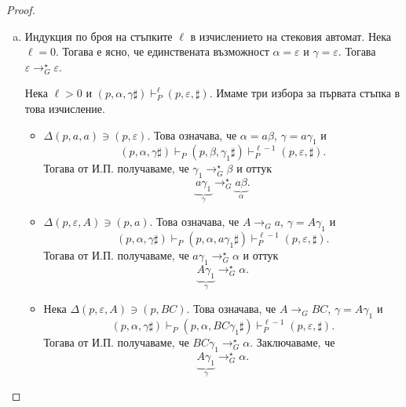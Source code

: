 \begin{proof}
\begin{enumerate}[(a)]
    Нека $\ell > 0$ и $S \stackrel{\ell}{\to}_G \alpha\gamma$. Това означава, че този извод може да се запише по следния начин:
    \[S \stackrel{\ell-1}{\to}_G \alpha_1A\gamma_2 \to_G \underbrace{\alpha_1\alpha_2}_{\alpha}\underbrace{\gamma_1\gamma_2}_{\gamma},\]
    където $A \to_G \alpha_2\gamma_1$ е правилото в граматиката, което сме приложили най-накрая. Тогава от И.П. имаме, че
    \begin{equation}
      \label{eq:5}
      (p, \alpha_1, S\sharp) \vdash^\star_P (p, \varepsilon, A\gamma_2\sharp).
    \end{equation}
    Тогава имаме следното изчисление на стековия автомат:
    \begin{align*}
      (p, \alpha_1\alpha_2, S\sharp) & \vdash^\star_P (p, \alpha_2, A\gamma_2\sharp) & \comment{\text{от (\ref{eq:5})}}\\
                                     & \vdash_P (p, \alpha_2, \alpha_2\gamma_1\gamma_2\sharp) & \comment{\text{ред (2) от деф. на }\Delta}\\
                                     & \vdash^\star_P (p, \varepsilon, \gamma_1\gamma_2\sharp) & \comment{\text{ред (3) от деф. на }\Delta}.
    \end{align*}
  \item
    Индукция по броя на стъпките $\ell$ в изчислението на стековия автомат.
    Нека $\ell = 0$. Тогава е ясно, че единствената възможност $\alpha = \varepsilon$ и $\gamma = \varepsilon$.
    Тогава $\varepsilon \to^\star_G \varepsilon$.
    
    Нека $\ell > 0$ и $(p, \alpha, \gamma \sharp) \vdash^{\ell}_P (p, \varepsilon, \sharp)$.
    Имаме три избора за първата стъпка в това изчисление.
    \begin{itemize}
    \item
      $\Delta(p,a,a) \ni (p,\varepsilon)$.
      Това означава, че $\alpha = a\beta$, $\gamma = a\gamma_1$ и
      \[(p, \alpha, \gamma \sharp) \vdash_P (p,\beta,\gamma_1\sharp ) \vdash^{\ell-1}_P (p, \varepsilon, \sharp).\]
      Тогава от И.П. получаваме, че $\gamma_1 \to^\star_G \beta$ и оттук
      \[\underbrace{a \gamma_1}_{\gamma} \to^\star_G \underbrace{a\beta}_{\alpha}.\]
    \item
      $\Delta(p,\varepsilon,A) \ni (p,a)$. Това означава, че $A \to_G a$, $\gamma = A\gamma_1$ и
      \[(p, \alpha, \gamma \sharp) \vdash_P (p,\alpha,a\gamma_1\sharp ) \vdash^{\ell-1}_P (p, \varepsilon, \sharp).\]
      Тогава от И.П. получаваме, че $a\gamma_1 \to^\star_G \alpha$ и оттук
      \[\underbrace{A\gamma_1}_{\gamma} \to^\star_G \alpha.\]
    \item
      Нека $\Delta(p,\varepsilon,A) \ni (p,BC)$. Това означава, че $A \to_G BC$, $\gamma = A\gamma_1$ и
      \[(p, \alpha, \gamma \sharp) \vdash_P (p,\alpha, BC\gamma_1\sharp ) \vdash^{\ell-1}_P (p, \varepsilon, \sharp).\]
      Тогава от И.П. получаваме, че
      $BC\gamma_1 \to^\star_G \alpha$. Заключаваме, че
      \[ \underbrace{A\gamma_1}_{\gamma}\to^\star_G \alpha.\]
    \end{itemize}
  \end{enumerate}
\end{proof}

